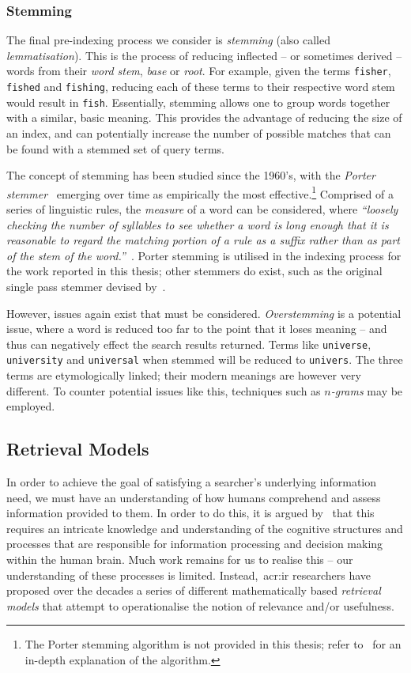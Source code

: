 \subsubsection{Stemming}
The final pre-indexing process we consider is \emph{stemming} (also called \emph{lemmatisation}). This is the process of reducing inflected -- or sometimes derived -- words from their \emph{word stem}, \emph{base} or \emph{root}. For example, given the terms \texttt{fisher}, \texttt{fished} and \texttt{fishing}, reducing each of these terms to their respective word stem would result in \texttt{fish}. Essentially, stemming allows one to group words together with a similar, basic meaning. This provides the advantage of reducing the size of an index, and can potentially increase the number of possible matches that can be found with a stemmed set of query terms.

The concept of stemming has been studied since the 1960's, with the \emph{Porter stemmer}~\citep{porter1980algorithm} emerging over time as empirically the most effective.\footnote{The Porter stemming algorithm is not provided in this thesis; refer to~\cite{porter1980algorithm} for an in-depth explanation of the algorithm.} Comprised of a series of linguistic rules, the \emph{measure} of a word can be considered, where \emph{``loosely checking the number of syllables to see whether a word is long enough that it is reasonable to regard the matching portion of a rule as a suffix rather than as part of the stem of the word.''}~\citep{manning2008ir}. Porter stemming is utilised in the indexing process for the work reported in this thesis; other stemmers do exist, such as the original single pass stemmer devised by~\cite{lovins1968development}.

However, issues again exist that must be considered. \emph{Overstemming} is a potential issue, where a word is reduced too far to the point that it loses meaning -- and thus can negatively effect the search results returned. Terms like \texttt{universe}, \texttt{university} and \texttt{universal} when stemmed will be reduced to \texttt{univers}. The three terms are etymologically linked; their modern meanings are however very different. To counter potential issues like this, techniques such as \emph{$n$-grams} may be employed.


\subsection{Retrieval Models}\label{sec:ir_background:basics:models}
In order to achieve the goal of satisfying a searcher's underlying information need, we must have an understanding of how humans comprehend and assess information provided to them. In order to do this, it is argued by~\cite{whiting2015phd} that this requires an intricate knowledge and understanding of the cognitive structures and processes that are responsible for information processing and decision making within the human brain. Much work remains for us to realise this -- our understanding of these processes is limited. Instead,~\gls{acr:ir} researchers have proposed over the decades a series of different mathematically based \emph{retrieval models} that attempt to operationalise the notion of relevance and/or usefulness.


